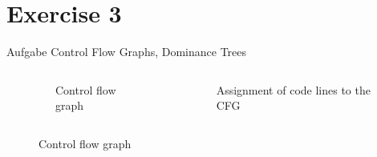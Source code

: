 
\section{Exercise 3}

\setcounter{exercise}{2}

\begin{frame}[allowframebreaks]{Aufgabe \thesection}{Control Flow Graphs, Dominance Trees}
  \begin{solution}
    \begin{columns}
      \begin{column}[t]{0.3\textwidth}
        \begin{linenums}
        \end{linenums}
      \end{column}
      \begin{column}[t]{0.3\textwidth}
        \begin{figure}
          \caption{Control flow graph}
        \end{figure}
      \end{column}
      \begin{column}[t]{0.3\textwidth}
        \begin{figure}
          \caption{Assignment of code lines to the CFG}
        \end{figure}
      \end{column}
    \end{columns}
  \end{solution}
  \begin{solutionnoinc}
    \begin{columns}
      \begin{column}[t]{0.3\textwidth}
        \begin{figure}
          \caption{Control flow graph}
        \end{figure}
      \end{column}
      \begin{column}[t]{0.7\textwidth}
        \domtreecalc
      \end{column}
    \end{columns}
  \end{solutionnoinc}

\end{frame}
